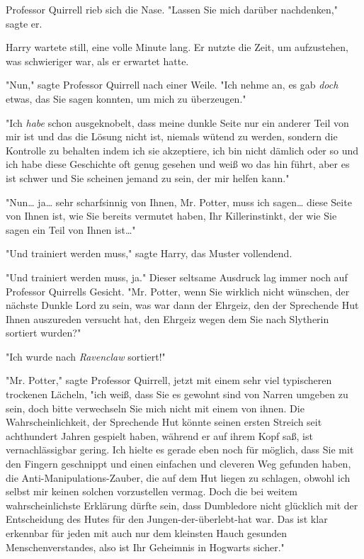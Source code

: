 {Professor Quirrell rieb sich die Nase. "Lassen Sie mich darüber nachdenken," sagte er.

Harry wartete still, eine volle Minute lang. Er nutzte die Zeit, um aufzustehen, was schwieriger war, als er erwartet hatte.

"Nun," sagte Professor Quirrell nach einer Weile. "Ich nehme an, es gab \emph{doch} etwas, das Sie sagen konnten, um mich zu überzeugen."

"Ich \emph{habe} schon ausgeknobelt, dass meine dunkle Seite nur ein anderer Teil von mir ist und das die Lösung nicht ist, niemals wütend zu werden, sondern die Kontrolle zu behalten indem ich sie akzeptiere, ich bin nicht dämlich oder so und ich habe diese Geschichte oft genug gesehen und weiß wo das hin führt, aber es ist schwer und Sie scheinen jemand zu sein, der mir helfen kann."

"Nun… ja… sehr scharfsinnig von Ihnen, Mr. Potter, muss ich sagen… diese Seite von Ihnen ist, wie Sie bereits vermutet haben, Ihr Killerinstinkt, der wie Sie sagen ein Teil von Ihnen ist…"

"Und trainiert werden muss," sagte Harry, das Muster vollendend.

"Und trainiert werden muss, ja." Dieser seltsame Ausdruck lag immer noch auf Professor Quirrells Gesicht. "Mr. Potter, wenn Sie wirklich nicht wünschen, der nächste Dunkle Lord zu sein, was war dann der Ehrgeiz, den der Sprechende Hut Ihnen auszureden versucht hat, den Ehrgeiz wegen dem Sie nach Slytherin sortiert wurden?"

"Ich wurde nach \emph{Ravenclaw} sortiert!"

"Mr. Potter," sagte Professor Quirrell, jetzt mit einem sehr viel typischeren trockenen Lächeln, "ich weiß, dass Sie es gewohnt sind von Narren umgeben zu sein, doch bitte verwechseln Sie mich nicht mit einem von ihnen. Die Wahrscheinlichkeit, der Sprechende Hut könnte seinen ersten Streich seit achthundert Jahren gespielt haben, während er auf ihrem Kopf saß, ist vernachlässigbar gering. Ich hielte es gerade eben noch für möglich, dass Sie mit den Fingern geschnippt und einen einfachen und cleveren Weg gefunden haben, die Anti-Manipulations-Zauber, die auf dem Hut liegen zu schlagen, obwohl ich selbst mir keinen solchen vorzustellen vermag. Doch die bei weitem wahrscheinlichste Erklärung dürfte sein, dass Dumbledore nicht glücklich mit der Entscheidung des Hutes für den Jungen-der-überlebt-hat war. Das ist klar erkennbar für jeden mit auch nur dem kleinsten Hauch gesunden Menschenverstandes, also ist Ihr Geheimnis in Hogwarts sicher."

}
